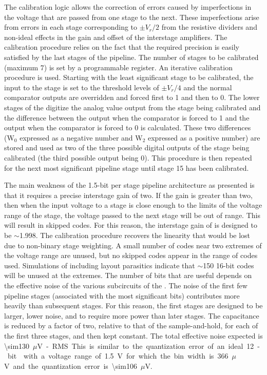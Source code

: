 The calibration logic allows the correction of errors caused by imperfections
in the voltage that are passed from one stage to the next.  These imperfections
arise from errors in each stage corresponding to $\pm V_r/2$ from the resistive
dividers and non-ideal effects in the gain and offset of the interstage amplifiers.
The calibration procedure relies on the fact that the required precision is easily
satisfied by the last stages of the pipeline.
The number of stages to be calibrated (maximum \num{7}) is set by a programmable
register.  An iterative calibration procedure is used.  Starting with the least
significant stage to be calibrated, the input to the stage is set to the threshold
levels of $\pm V_r/4$ and the normal comparator outputs are overridden
and forced first to \num{1} and then to \num{0}.  The lower stages of the  digitize
the analog value output from the stage being calibrated and the difference between
the  output when the comparator is forced to \num{1} and the 
output when the comparator is forced to \num{0} is calculated.  These two differences
(W$_0$ expressed as a negative number and W$_2$ expressed as a positive number) are
stored and used as two of the three possible digital outputs of the stage being
calibrated (the third possible output being \num{0}).  This procedure is then repeated
for the next most significant pipeline stage until stage \num{15} has been calibrated.

The main weakness of the \num{1.5}-bit per stage pipeline architecture as presented
is that it requires a precise interstage gain of two.  If the gain is greater
than two, then when the input voltage to a stage is close enough to the limits
of the voltage range of the stage, the voltage passed to the next stage will be
out of range.  This will result in skipped  codes.  For this reason,
the interstage gain of  is designed to be $\sim$\num{1.998}.  The
calibration procedure recovers the linearity that would be lost due to
non-binary stage weighting.  A small number of  codes near two
extremes of the voltage range are unused, but no skipped codes appear in the
range of codes used. Simulations of  including layout parasitics 
indicate that $\sim$\num{150} \num{16}-bit codes will be unused at the extremes.
The number of  bits that are useful depends on the effective
noise of the various subcircuits of the .  The noise of the first few
pipeline stages (associated with the most significant bits) contributes more
heavily than subsequent stages.  For this reason, the first stages are designed
to be larger, lower noise, and to require more power than later stages. The capacitance
is reduced by a factor of two, relative to that of the sample-and-hold, for each
of the first three stages, and then kept constant. The total
effective noise expected is \SI{\sim130}{$\mu$V}-RMS.  This is similar to the
quantization error of an ideal \num{12}-bit  with a voltage range of
\SI{1.5}{V} for which the bin width is \SI{366}{$\mu$V} and the quantization
error is \SI{\sim106}{$\mu$V}.

